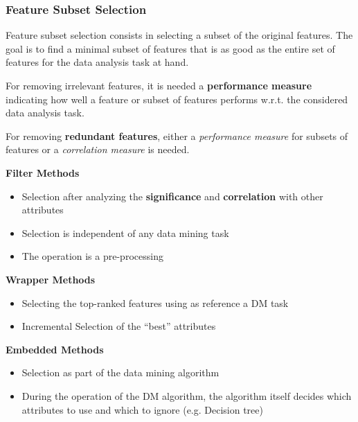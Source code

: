 \subsubsection{Feature Subset Selection}
Feature subset selection consists in selecting a subset of the original features.
The goal is to find a minimal subset of features that is as good as the entire set of features for the data analysis task at hand.

For removing irrelevant features, it is needed a \textbf{performance measure} indicating how well a feature
or subset of features performs w.r.t. the considered
data analysis task.

For removing \textbf{redundant features}, either a
\textit{performance measure} for subsets of features or a
\textit{correlation measure} is needed.

\textbf{Filter Methods}
\begin{itemize}
	\item Selection after analyzing the \textbf{significance} and \textbf{correlation} with other
attributes
	\item Selection is independent of any data mining task
	\item The operation is a pre-processing
\end{itemize}
\textbf{Wrapper Methods}
\begin{itemize}
	\item Selecting the top-ranked features using as reference a DM task
	\item Incremental Selection of the ``best'' attributes
\end{itemize}
\textbf{Embedded Methods}
\begin{itemize}
	\item Selection as part of the data mining algorithm
	\item During the operation of the DM algorithm, the algorithm itself decides which attributes to use and which to ignore (e.g. Decision tree)
\end{itemize}

